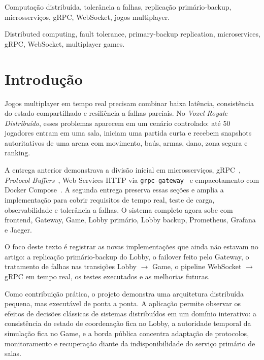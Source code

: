 \documentclass[portuguese]{sbcreviews-2025}%
\begin{document}
\begin{frontmatter}
\begin{pchaves}
Computação distribuída, tolerância a falhas, replicação primário-backup, microsserviços, gRPC, WebSocket, jogos multiplayer.
\end{pchaves}

\begin{keywords}
Distributed computing, fault tolerance, primary-backup replication, microservices, gRPC, WebSocket, multiplayer games.
\end{keywords}

\end{frontmatter}

\section{Introdução}
\label{sec:intro}

Jogos multiplayer em tempo real precisam combinar baixa latência, consistência do estado compartilhado e resiliência a falhas parciais. No \textit{Voxel Royale Distribuído}, esses problemas aparecem em um cenário controlado: até 50 jogadores entram em uma sala, iniciam uma partida curta e recebem snapshots autoritativos de uma arena com movimento, baús, armas, dano, zona segura e ranking.

A entrega anterior demonstrava a divisão inicial em microsserviços, gRPC~\cite{grpc}, \textit{Protocol Buffers}~\cite{protobuf}, Web Services HTTP via \texttt{grpc-gateway}~\cite{grpcgateway} e empacotamento com Docker Compose~\cite{dockercompose}. A segunda entrega preserva essas seções e amplia a implementação para cobrir requisitos de tempo real, teste de carga, observabilidade e tolerância a falhas. O sistema completo agora sobe com frontend, Gateway, Game, Lobby primário, Lobby backup, Prometheus, Grafana e Jaeger.

O foco deste texto é registrar as novas implementações que ainda não estavam no artigo: a replicação primário-backup do Lobby, o failover feito pelo Gateway, o tratamento de falhas nas transições Lobby $\rightarrow$ Game, o pipeline WebSocket $\rightarrow$ gRPC em tempo real, os testes executados e as melhorias futuras.

Como contribuição prática, o projeto demonstra uma arquitetura distribuída pequena, mas executável de ponta a ponta. A aplicação permite observar os efeitos de decisões clássicas de sistemas distribuídos em um domínio interativo: a consistência do estado de coordenação fica no Lobby, a autoridade temporal da simulação fica no Game, e a borda pública concentra adaptação de protocolos, monitoramento e recuperação diante da indisponibilidade do serviço primário de salas.
\end{document}
